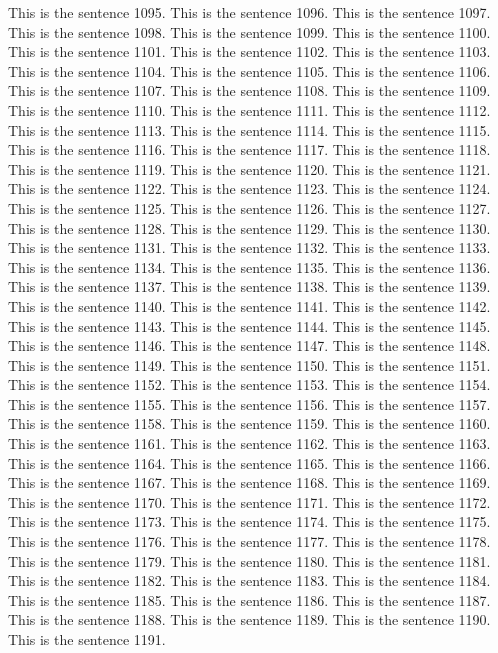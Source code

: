 \documentclass{article}
\begin{document}
This is the sentence 1095.
This is the sentence 1096.
This is the sentence 1097.
This is the sentence 1098.
This is the sentence 1099.
This is the sentence 1100.
This is the sentence 1101.
This is the sentence 1102.
This is the sentence 1103.
This is the sentence 1104.
This is the sentence 1105.
This is the sentence 1106.
This is the sentence 1107.
This is the sentence 1108.
This is the sentence 1109.
This is the sentence 1110.
This is the sentence 1111.
This is the sentence 1112.
This is the sentence 1113.
This is the sentence 1114.
This is the sentence 1115.
This is the sentence 1116.
This is the sentence 1117.
This is the sentence 1118.
This is the sentence 1119.
This is the sentence 1120.
This is the sentence 1121.
This is the sentence 1122.
This is the sentence 1123.
This is the sentence 1124.
This is the sentence 1125.
This is the sentence 1126.
This is the sentence 1127.
This is the sentence 1128.
This is the sentence 1129.
This is the sentence 1130.
This is the sentence 1131.
This is the sentence 1132.
This is the sentence 1133.
This is the sentence 1134.
This is the sentence 1135.
This is the sentence 1136.
This is the sentence 1137.
This is the sentence 1138.
This is the sentence 1139.
This is the sentence 1140.
This is the sentence 1141.
This is the sentence 1142.
This is the sentence 1143.
This is the sentence 1144.
This is the sentence 1145.
This is the sentence 1146.
This is the sentence 1147.
This is the sentence 1148.
This is the sentence 1149.
This is the sentence 1150.
This is the sentence 1151.
This is the sentence 1152.
This is the sentence 1153.
This is the sentence 1154.
This is the sentence 1155.
This is the sentence 1156.
This is the sentence 1157.
This is the sentence 1158.
This is the sentence 1159.
This is the sentence 1160.
This is the sentence 1161.
This is the sentence 1162.
This is the sentence 1163.
This is the sentence 1164.
This is the sentence 1165.
This is the sentence 1166.
This is the sentence 1167.
This is the sentence 1168.
This is the sentence 1169.
This is the sentence 1170.
This is the sentence 1171.
This is the sentence 1172.
This is the sentence 1173.
This is the sentence 1174.
This is the sentence 1175.
This is the sentence 1176.
This is the sentence 1177.
This is the sentence 1178.
This is the sentence 1179.
This is the sentence 1180.
This is the sentence 1181.
This is the sentence 1182.
This is the sentence 1183.
This is the sentence 1184.
This is the sentence 1185.
This is the sentence 1186.
This is the sentence 1187.
This is the sentence 1188.
This is the sentence 1189.
This is the sentence 1190.
This is the sentence 1191.
\end{document}
